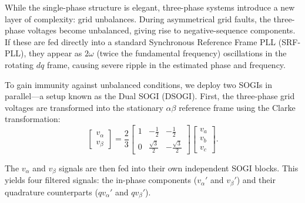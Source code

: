 While the single-phase structure is elegant, three-phase systems introduce a new layer of complexity: grid unbalances. During asymmetrical grid faults, the three-phase voltages become unbalanced, giving rise to negative-sequence components. If these are fed directly into a standard Synchronous Reference Frame PLL (SRF-PLL), they appear as \(2\omega\) (twice the fundamental frequency) oscillations in the rotating \(dq\) frame, causing severe ripple in the estimated phase and frequency.

To gain immunity against unbalanced conditions, we deploy two SOGIs in parallel—a setup known as the Dual SOGI (DSOGI). First, the three-phase grid voltages are transformed into the stationary \(\alpha\beta\) reference frame using the Clarke transformation:
\begin{equation}
	\label{eq:clarke-transform}
	\begin{bmatrix} v_\alpha \\ v_\beta \end{bmatrix}
	= \frac{2}{3} \begin{bmatrix} 
		1 & -\frac{1}{2} & -\frac{1}{2} \\ 
		0 & \frac{\sqrt{3}}{2} & -\frac{\sqrt{3}}{2} 
	  \end{bmatrix} 
	\begin{bmatrix} v_a \\ v_b \\ v_c \end{bmatrix}.
\end{equation}

The \(v_\alpha\) and \(v_\beta\) signals are then fed into their own independent SOGI blocks. This yields four filtered signals: the in-phase components (\(v_\alpha'\) and \(v_\beta'\)) and their quadrature counterparts (\(qv_\alpha'\) and \(qv_\beta'\)). 

